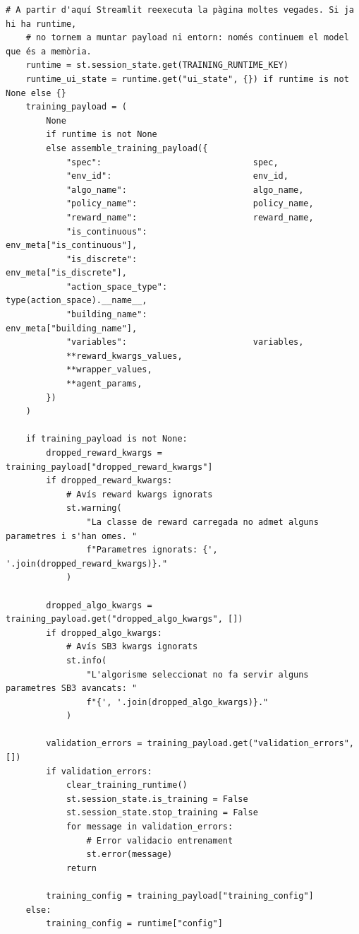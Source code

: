\documentclass[10pt,a4paper]{article}
\begin{document}
\begin{lstlisting}[style=studioPython,caption={pages/Entrenar\_Agent.py},label={lst:pages-entrenar-agent-py}]
    # A partir d'aquí Streamlit reexecuta la pàgina moltes vegades. Si ja hi ha runtime,
    # no tornem a muntar payload ni entorn: només continuem el model que és a memòria.
    runtime = st.session_state.get(TRAINING_RUNTIME_KEY)
    runtime_ui_state = runtime.get("ui_state", {}) if runtime is not None else {}
    training_payload = (
        None
        if runtime is not None
        else assemble_training_payload({
            "spec":                              spec,
            "env_id":                            env_id,
            "algo_name":                         algo_name,
            "policy_name":                       policy_name,
            "reward_name":                       reward_name,
            "is_continuous":                     env_meta["is_continuous"],
            "is_discrete":                       env_meta["is_discrete"],
            "action_space_type":                 type(action_space).__name__,
            "building_name":                     env_meta["building_name"],
            "variables":                         variables,
            **reward_kwargs_values,
            **wrapper_values,
            **agent_params,
        })
    )

    if training_payload is not None:
        dropped_reward_kwargs = training_payload["dropped_reward_kwargs"]
        if dropped_reward_kwargs:
            # Avís reward kwargs ignorats
            st.warning(
                "La classe de reward carregada no admet alguns parametres i s'han omes. "
                f"Parametres ignorats: {', '.join(dropped_reward_kwargs)}."
            )

        dropped_algo_kwargs = training_payload.get("dropped_algo_kwargs", [])
        if dropped_algo_kwargs:
            # Avís SB3 kwargs ignorats
            st.info(
                "L'algorisme seleccionat no fa servir alguns parametres SB3 avancats: "
                f"{', '.join(dropped_algo_kwargs)}."
            )

        validation_errors = training_payload.get("validation_errors", [])
        if validation_errors:
            clear_training_runtime()
            st.session_state.is_training = False
            st.session_state.stop_training = False
            for message in validation_errors:
                # Error validacio entrenament
                st.error(message)
            return

        training_config = training_payload["training_config"]
    else:
        training_config = runtime["config"]


\end{lstlisting}
\end{document}
